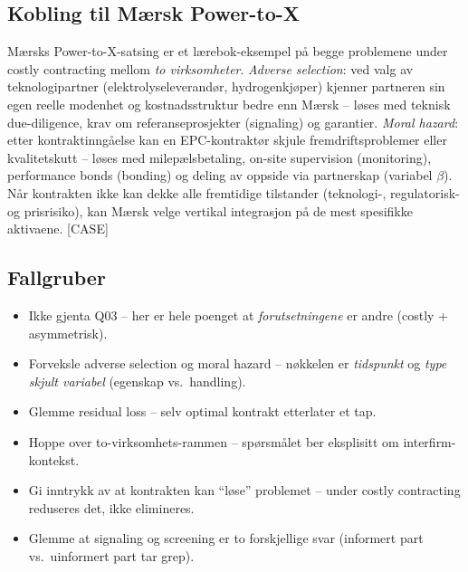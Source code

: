 \subsection*{Kobling til Mærsk Power-to-X}
Mærsks Power-to-X-satsing er et lærebok-eksempel på begge problemene under costly contracting mellom \emph{to virksomheter}. \emph{Adverse selection}: ved valg av teknologipartner (elektrolyseleverandør, hydrogenkjøper) kjenner partneren sin egen reelle modenhet og kostnadsstruktur bedre enn Mærsk -- løses med teknisk due-diligence, krav om referanseprosjekter (signaling) og garantier. \emph{Moral hazard}: etter kontraktinngåelse kan en EPC-kontraktør skjule fremdriftsproblemer eller kvalitetskutt -- løses med milepælsbetaling, on-site supervision (monitoring), performance bonds (bonding) og deling av oppside via partnerskap (variabel $\beta$). Når kontrakten ikke kan dekke alle fremtidige tilstander (teknologi-, regulatorisk- og prisrisiko), kan Mærsk velge vertikal integrasjon på de mest spesifikke aktivaene. [CASE]

\subsection*{Fallgruber}
\begin{itemize}\setlength{\itemsep}{2pt}
\item Ikke gjenta Q03 -- her er hele poenget at \emph{forutsetningene} er andre (costly + asymmetrisk).
\item Forveksle adverse selection og moral hazard -- nøkkelen er \emph{tidspunkt} og \emph{type skjult variabel} (egenskap vs.\ handling).
\item Glemme residual loss -- selv optimal kontrakt etterlater et tap.
\item Hoppe over to-virksomhets-rammen -- spørsmålet ber eksplisitt om interfirm-kontekst.
\item Gi inntrykk av at kontrakten kan ``løse'' problemet -- under costly contracting reduseres det, ikke elimineres.
\item Glemme at signaling og screening er to forskjellige svar (informert part vs.\ uinformert part tar grep).
\end{itemize}

\FloatBarrier
